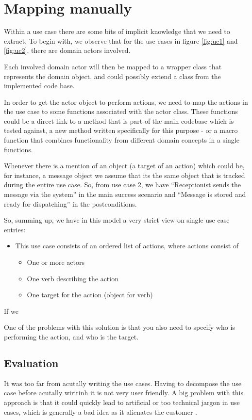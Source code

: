 \section{Mapping manually}
Within a use case there are some bits of implicit knowledge that we need to extract. To begin with, we observe that for the use cases in figure \ref{fig:uc1} and \ref{fig:uc2}, there are domain actors involved.

Each involved domain actor will then be mapped to a wrapper class that represents the domain object, and could possibly extend a class from the implemented code base.

In order to get the actor object to perform actions, we need to map the actions in the use case to some functions associated with the actor class. These functions could be a direct link to a method that is part of the main codebase which is tested against, a new method written specifically for this purpose - or a macro function that combines functionality from different domain concepts in a single functions.

Whenever there is a mention of an object (a target of an action) which could be, for instance, a message object we assume that its the same object that is tracked during the entire use case. So, from use case 2, we have ``Receptionist sends the message via the system'' in the main success scenario and ``Message is stored and ready for dispatching'' in the postconditions.

So, summing up, we have in this model a very strict view on single use case entries:
\begin{itemize}
  \item This use case consists of an ordered list of actions, where actions consist of
  \begin{itemize}
	\item One or more actors
	\item One verb describing the action
	\item One target for the action (object for verb)
  \end{itemize}
\end{itemize}
If we 


One of the problems with this solution is that you also need to specify who is performing the action, and who is the target.
\subsection{Evaluation}
It was too far from acutally writing the use cases. Having to decompose the use case before acutally wiritinh it is not very user friendly. 
A big problem with this approach is that it could quickly lead to artificial or too technical jargon in use cases, which is generally a bad idea as it alienates the customer \cite{christel1992}.
